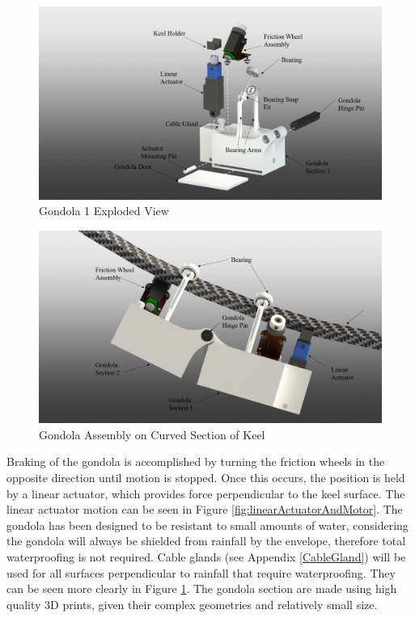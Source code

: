 \documentclass[../main.tex]{subfiles}
\begin{document}
\begin{figure}[H]
	\centering
	\includegraphics[width=.8\linewidth]{img/design/gondola/gondola1ExplodedView.png}
	\caption{Gondola 1 Exploded View}
	\label{fig:gondola1ExplodedView}
\end{figure}

\begin{figure}[H]
	\centering
	\includegraphics[width=.8\linewidth]{img/design/gondola/gondolaBent.png}
	\caption{Gondola Assembly on Curved Section of Keel}
	\label{fig:gondolaBent}
\end{figure}

Braking of the gondola is accomplished by turning the friction wheels in the opposite direction until motion is stopped. Once this occurs, the position is held by a linear actuator, which provides force perpendicular to the keel surface. The linear actuator motion can be seen in Figure \ref{fig:linearActuatorAndMotor}. The gondola has been designed to be resistant to small amounts of water, considering the gondola will always be shielded from rainfall by the envelope, therefore total waterproofing is not required. Cable glands (see Appendix \ref{CableGland}) will be used for all surfaces perpendicular to rainfall that require waterproofing. They can be seen more clearly in Figure \ref{fig:gondola1ExplodedView}. The gondola section are made using high quality 3D prints, given their complex geometries and relatively small size.
\\
\end{document}
